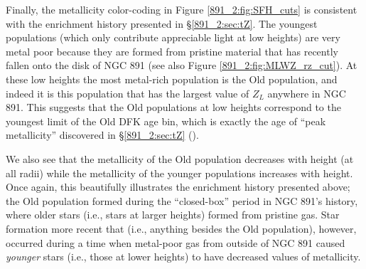 


Finally, the metallicity color-coding in Figure
\ref{891_2:fig:SFH_cuts} is consistent with the enrichment history
presented in \S\ref{891_2:sec:tZ}. The youngest populations (which
only contribute appreciable light at low heights) are very metal poor
because they are formed from pristine material that has recently
fallen onto the disk of NGC 891 (see also Figure
\ref{891_2:fig:MLWZ_rz_cut}). At these low heights the most metal-rich
population is the Old population, and indeed it is this population
that has the largest value of $Z_L$ anywhere in NGC 891. This suggests
that the Old populations at low heights correspond to the youngest
limit of the Old DFK age bin, which is exactly the age of ``peak
metallicity'' discovered in \S\ref{891_2:sec:tZ} ().

We also see that the metallicity of the Old population decreases with
height (at all radii) while the metallicity of the younger populations
increases with height. Once again, this beautifully illustrates the
enrichment history presented above; the Old population formed during
the ``closed-box'' period in NGC 891's history, where older stars
(i.e., stars at larger heights) formed from pristine gas. Star
formation more recent that  (i.e., anything besides the
Old population), however, occurred during a time when metal-poor gas
from outside of NGC 891 caused \emph{younger} stars (i.e., those at
lower heights) to have decreased values of metallicity.


